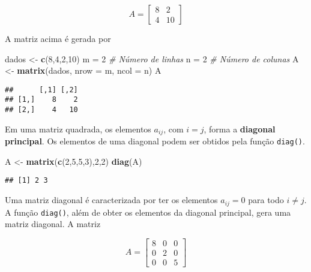 \documentclass[
]{book}
\newenvironment{Shaded}{\begin{snugshade}}{\end{snugshade}}
\newcommand{\CommentTok}[1]{\textcolor[rgb]{0.56,0.35,0.01}{\textit{#1}}}
\newcommand{\DataTypeTok}[1]{\textcolor[rgb]{0.13,0.29,0.53}{#1}}
\newcommand{\DecValTok}[1]{\textcolor[rgb]{0.00,0.00,0.81}{#1}}
\newcommand{\KeywordTok}[1]{\textcolor[rgb]{0.13,0.29,0.53}{\textbf{#1}}}
\newcommand{\NormalTok}[1]{#1}
\newcommand{\StringTok}[1]{\textcolor[rgb]{0.31,0.60,0.02}{#1}}
\begin{document}
\begin{equation*}
A = 
\begin{bmatrix}
8 & 2 \\
4 & 10
\end{bmatrix}
\end{equation*}

A matriz acima é gerada por

\begin{Shaded}
\begin{Highlighting}[]
\NormalTok{dados \textless{}{-}}\StringTok{ }\KeywordTok{c}\NormalTok{(}\DecValTok{8}\NormalTok{,}\DecValTok{4}\NormalTok{,}\DecValTok{2}\NormalTok{,}\DecValTok{10}\NormalTok{)}
\NormalTok{m =}\StringTok{ }\DecValTok{2} \CommentTok{\# Número de linhas}
\NormalTok{n =}\StringTok{ }\DecValTok{2} \CommentTok{\# Número de colunas }
\NormalTok{A \textless{}{-}}\StringTok{ }\KeywordTok{matrix}\NormalTok{(dados, }\DataTypeTok{nrow =}\NormalTok{ m, }\DataTypeTok{ncol =}\NormalTok{ n)}
\NormalTok{A}
\end{Highlighting}
\end{Shaded}

\begin{verbatim}
##      [,1] [,2]
## [1,]    8    2
## [2,]    4   10
\end{verbatim}

Em uma matriz quadrada, os elementos \(a_{ij}\), com \(i = j\), forma a \textbf{diagonal principal}. Os elementos de uma diagonal podem ser obtidos pela função \texttt{diag()}.

\begin{Shaded}
\begin{Highlighting}[]
\NormalTok{A \textless{}{-}}\StringTok{ }\KeywordTok{matrix}\NormalTok{(}\KeywordTok{c}\NormalTok{(}\DecValTok{2}\NormalTok{,}\DecValTok{5}\NormalTok{,}\DecValTok{5}\NormalTok{,}\DecValTok{3}\NormalTok{),}\DecValTok{2}\NormalTok{,}\DecValTok{2}\NormalTok{)}
\KeywordTok{diag}\NormalTok{(A)}
\end{Highlighting}
\end{Shaded}

\begin{verbatim}
## [1] 2 3
\end{verbatim}

Uma matriz diagonal é caracterizada por ter os elementos \(a_{ij} = 0\) para todo \(i \neq j\). A função \texttt{diag()}, além de obter os elementos da diagonal principal, gera uma matriz diagonal. A matriz

\begin{equation*}
A = 
\begin{bmatrix}
8 & 0 & 0\\
0 & 2 & 0\\
0 & 0 & 5
\end{bmatrix}
\end{equation*}
\end{document}
